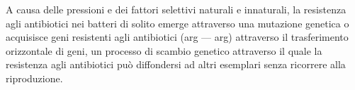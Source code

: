 \documentclass[../main.tex]{subfiles}
\begin{document}
A causa delle pressioni e dei fattori selettivi naturali e innaturali, la resistenza agli antibiotici nei batteri di solito emerge attraverso una mutazione genetica o acquisisce geni resistenti agli antibiotici (\acrlong{arg} --- \acrshort{arg}) attraverso il trasferimento orizzontale di geni, un processo di scambio genetico attraverso il quale la resistenza agli antibiotici può diffondersi ad altri esemplari senza ricorrere alla riproduzione.\cite{madigan_2015}
\end{document}
